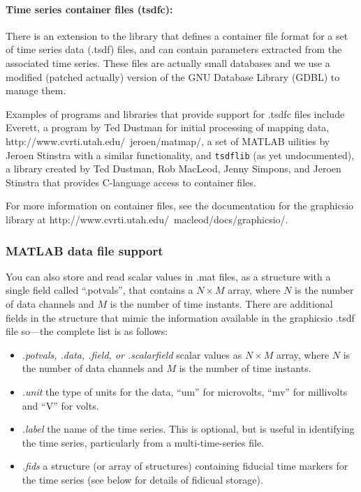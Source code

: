 \paragraph{Time series container files (tsdfc): } 
\label{sec:tsdfcfile}

There is an extension to the \graphicsio{} library that defines a container
file format for a set of time series data (.tsdf) files, and
can contain parameters extracted from the associated time series.  These
files are actually small databases and we use a modified (patched actually)
version of the GNU Database Library (GDBL) to manage them.  

Examples of programs and libraries that provide support for .tsdfc
files include Everett, a program by Ted Dustman for initial processing of
mapping data,  
{http://www.cvrti.utah.edu/~jeroen/matmap/}, a set of MATLAB uilities by
Jeroen Stinstra with a similar functionality, and \texttt{tsdflib} (as yet
undocumented), a library created by Ted Dustman, Rob MacLeod, Jenny
Simpons, and Jeroen Stinstra that provides C-language access to container
files.

For more information on container files, see the documentation for the
graphicsio library at
{http://www.cvrti.utah.edu/~macleod/docs/graphicsio/}. 

\subsubsection{MATLAB data file support}
\label{sec:matlabdata}

You can also store and read scalar values in .mat files, as a structure
with a single field called ``.potvals'', that contains a $N \times M$ array,
where $N$ is the number of data channels and $M$ is the number of time
instants.  There are additional fields in the structure that mimic the
information available in the graphicsio .tsdf file so---the complete list is
as follows:
%
\begin{itemize}
  \item \emph{.potvals, .data, .field, or .scalarfield} scalar values as $N
    \times M$ array, where $N$ is the number of data channels and $M$ is
    the number of time instants.
  \item \emph{.unit} the type of units for the data, ``um'' for microvolts,
  ``mv'' for millivolts and ``V'' for volts.
  \item \emph{.label} the name of the time series.  This is optional, but is
    useful in identifying the time series, particularly from a 
    multi-time-series file.
  \item \emph{.fids} a structure (or array of structures) containing
    fiducial time markers for the time series (see below for details of
    fidicual storage).
\end{itemize}

